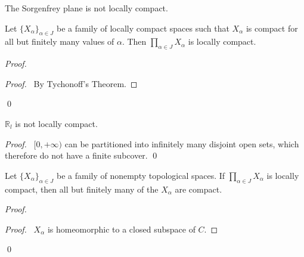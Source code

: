 \begin{cor}
The Sorgenfrey plane is not locally compact.
\end{cor}

\begin{prop}
 Let $\{ X_\alpha \}_{\alpha \in J}$ be a family of locally compact spaces
such that $X_\alpha$ is compact for all but finitely many values of $\alpha$.
Then $\prod_{\alpha \in J} X_\alpha$ is locally compact.
\end{prop}

\begin{proof}
\pf
{}
\begin{proof}
  \pf\ By Tychonoff's Theorem.
\end{proof}
\qed
\end{proof}

\begin{prop}
 $\mathbb{R}_l$ is not locally compact.
\end{prop}

\begin{proof}
\pf\ $[0, +\infty)$ can be partitioned into infinitely many disjoint open
sets, which therefore do not have a finite subcover. \qed
\end{proof}

  \begin{prop}
 Let $\{X_\alpha\}_{\alpha \in J}$ be a family of nonempty topological
spaces. If    $\prod_{\alpha \in J} X_\alpha$ is locally compact, then all but
finitely many of the $X_\alpha$ are compact.
\end{prop}

\begin{proof}
\pf
{}
\begin{proof}
  \pf\ $X_\alpha$ is homeomorphic to a closed subspace of $C$.
\end{proof}
\qed
\end{proof}

